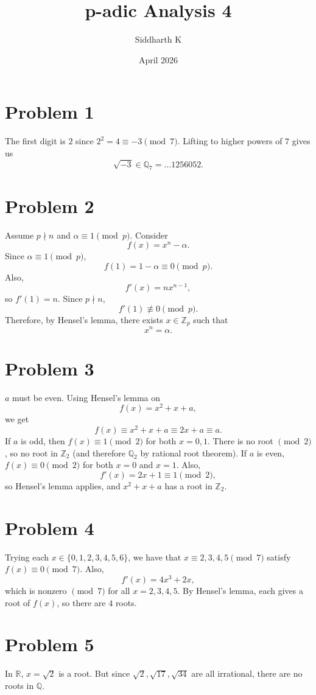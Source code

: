 \documentclass{article}
\title{p-adic Analysis 4}
\author{Siddharth K}
\date{April 2026}
\newcommand{\Z}{\mathbb{Z}}
\newcommand{\Q}{\mathbb{Q}}
\newcommand{\R}{\mathbb{R}}
\begin{document}
\maketitle

\section*{Problem 1}
The first digit is $2$ since $2^2 = 4 \equiv -3 \pmod{7}$. Lifting to higher powers of $7$ gives us
$$\sqrt{-3} \in \Q_7 = \ldots1256052.$$

\section*{Problem 2}
Assume $p \nmid n$ and $\alpha \equiv 1 \pmod{p}$. Consider
$$f(x) = x^n - \alpha.$$
Since $\alpha \equiv 1 \pmod{p}$,
$$f(1) = 1 - \alpha \equiv 0 \pmod{p}.$$
Also,
$$f'(x) = nx^{n - 1},$$
so $f'(1) = n$. Since $p \nmid n$,
$$f'(1) \not\equiv 0 \pmod{p}.$$
Therefore, by Hensel's lemma, there exists $x \in \Z_p$ such that
$$x^n = \alpha.$$

\section*{Problem 3}
$a$ must be even. Using Hensel's lemma on
$$f(x) = x^2 + x + a,$$
we get
$$f(x) \equiv x^2 + x + a \equiv 2x + a \equiv a.$$
If $a$ is odd, then $f(x) \equiv 1 \pmod{2}$ for both $x = 0,1$. There is no root $\pmod{2}$, so no root in $\Z_2$ (and therefore $\Q_2$ by rational root theorem). If $a$ is even, $f(x) \equiv 0 \pmod{2}$ for both $x = 0$ and $x = 1$. Also,
$$f'(x) = 2x + 1 \equiv 1 \pmod{2},$$
so Hensel's lemma applies, and $x^2 + x + a$ has a root in $\Z_2$.

\section*{Problem 4}
Trying each $x \in \{0,1,2,3,4,5,6\}$, we have that $x \equiv 2,3,4,5 \pmod{7}$ satisfy $f(x) \equiv 0 \pmod{7}$. Also,
$$f'(x) = 4x^3 + 2x,$$
which is nonzero $\pmod{7}$ for all $x = 2,3,4,5$. By Hensel's lemma, each gives a root of $f(x)$, so there are $4$ roots.

\section*{Problem 5}
In $\R$, $x = \sqrt{2}$ is a root. But since $\sqrt{2}, \sqrt{17}, \sqrt{34}$ are all irrational, there are no roots in $\Q$.
\end{document}
